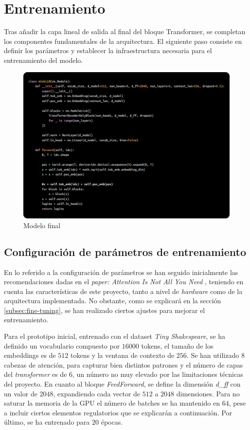 \documentclass[11pt]{book}
\begin{document}
\section{Entrenamiento}

Tras añadir la capa lineal de salida al final del bloque Transformer, se completan los componentes fundamentales de la arquitectura. El siguiente paso consiste en definir los parámetros y establecer la infraestructura necesaria para el entrenamiento del modelo.

\begin{figure}[h]
    \centering
    \includegraphics[width=0.5\linewidth]{img/gpt2.png}
    \caption{Modelo final}
    \label{fig:placeholder19}
\end{figure}

\subsection{Configuración de parámetros de entrenamiento}

En lo referido a la configuración de parámetros se han seguido inicialmente las recomendaciones dadas en el \textit{paper: Attention Is Not All You Need} \parencite{gerber2025ffn}, teniendo en cuenta las características de este proyecto, tanto a nivel de \textit{hardware} como de la arquitectura implementada. No obstante, como se explicará en la sección \ref{subsec:fine-tuning}, se han realizado ciertos ajustes para mejorar el entrenamiento.

Para el prototipo inicial, entrenado con el dataset \textit{Tiny Shakespeare}, se ha definido un vocabulario compuesto por $16000$ tokens, el tamaño de los embeddings es de $512$ tokens y la ventana de contexto de $256$. Se han utilizado $8$ cabezas de atención, para capturar bien distintos patrones y el número de capas del \textit{transformer} es de $6$, un número no muy elevado por las limitaciones técnicas del proyecto. En cuanto al bloque \textit{FeedForward}, se define la dimensión \textit{d\_ff} con un valor de $2048$, expandiendo cada vector de $512$ a $2048$ dimensiones. Para no saturar la memoria de la GPU el número de batches se ha mantenido en $64$, pese a incluir ciertos elementos regulatorios que se explicarán a continuación. Por último, se ha entrenado para $20$ épocas.
\end{document}
